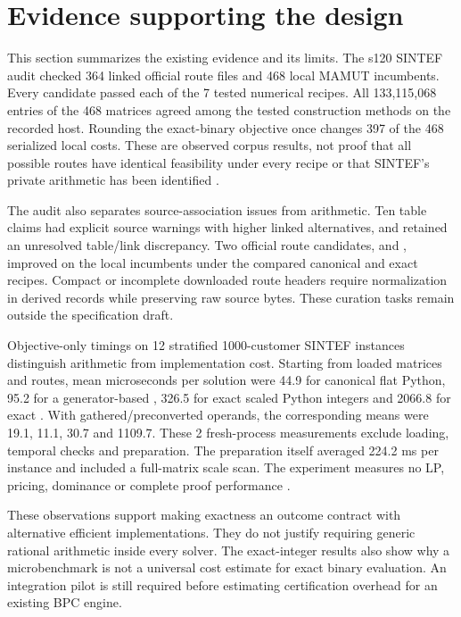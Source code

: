 \section{Evidence supporting the design}\label{sec:evidence}
This section summarizes the existing evidence and its limits. The s120 SINTEF audit checked 364 linked official route files and 468 local MAMUT incumbents. Every candidate passed each of the 7 tested numerical recipes. All 133,115,068 entries of the 468 matrices agreed among the tested construction methods on the recorded host. Rounding the exact-binary objective once changes 397 of the 468 serialized local costs. These are observed corpus results, not proof that all possible routes have identical feasibility under every recipe or that SINTEF's private arithmetic has been identified \autocite{onyrSintefAudit2026}.

The audit also separates source-association issues from arithmetic. Ten table claims had explicit source warnings with higher linked alternatives, and  retained an unresolved table/link discrepancy. Two official route candidates,  and , improved on the local incumbents under the compared canonical and exact recipes. Compact or incomplete downloaded route headers require normalization in derived records while preserving raw source bytes. These curation tasks remain outside the specification draft.

Objective-only timings on 12 stratified 1000-customer SINTEF instances distinguish arithmetic from implementation cost. Starting from loaded matrices and routes, mean microseconds per solution were 44.9 for canonical flat Python, 95.2 for a generator-based , 326.5 for exact scaled Python integers and 2066.8 for exact . With gathered/preconverted operands, the corresponding means were 19.1, 11.1, 30.7 and 1109.7. These 2 fresh-process measurements exclude loading, temporal checks and preparation. The preparation itself averaged 224.2 ms per instance and included a full-matrix scale scan. The experiment measures no LP, pricing, dominance or complete proof performance \autocite{onyrSintefRuntime2026}.

These observations support making exactness an outcome contract with alternative efficient implementations. They do not justify requiring generic rational arithmetic inside every solver. The exact-integer results also show why a  microbenchmark is not a universal cost estimate for exact binary evaluation. An integration pilot is still required before estimating certification overhead for an existing BPC engine.

